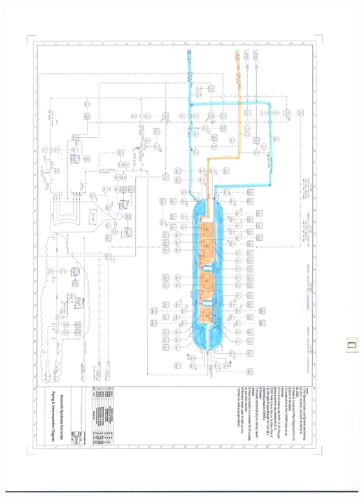 \documentclass[a4paper,oneside,12pt]{article}
\begin{document}
\begin{center}
\includegraphics[scale=0.7]{img/scan1.jpg}


\end{center}
\end{document}
